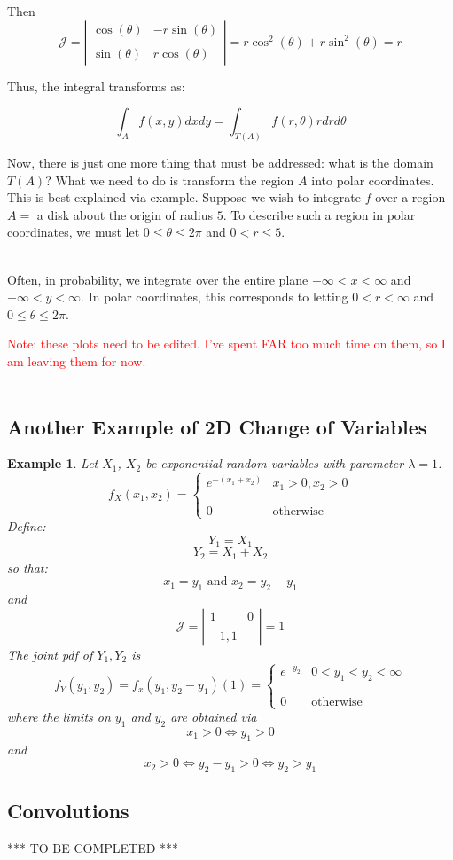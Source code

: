 \documentclass[12pt]{article} %
\newcommand{\pdf}[2]{\left\{\begin{matrix}
{#1} & {#2}\\\\\\0&\textrm{otherwise}
\end{matrix}\right.}
\newtheorem{example}{Example}
\begin{document}
Then 
$$\mathcal{J} = \left|\begin{matrix}
\cos(\theta) & -r\sin(\theta)\\\\ \sin(\theta) & r\cos(\theta)
\end{matrix}\right| = r\cos^2(\theta) + r\sin^2(\theta) = r$$

Thus, the integral transforms as:

$$\int_A f(x,y) dx dy = \int_{T(A)} f(r,\theta) r dr d\theta$$

Now, there is just one more thing that must be addressed: what is the domain $T(A)$? What we need to do is transform the region $A$ into polar coordinates. This is best explained via example. Suppose we wish to integrate $f$ over a region $A=$ a disk about the origin of radius $5$. To describe such a region in polar coordinates, we must let $0\leq\theta\leq 2\pi$ and $0<r\leq5$. \\\\


Often, in probability, we integrate over the entire plane $-\infty<x<\infty$ and $-\infty<y<\infty$.  In polar coordinates, this corresponds to letting $0<r<\infty$ and $0\leq \theta\leq 2\pi$. 

\textcolor{red}{Note: these plots need to be edited. I've spent FAR too much time on them, so I am leaving them for now.}\\\\
\subsection{Another Example of 2D Change of Variables}
\begin{example}
Let $X_1$, $X_2$ be exponential random variables with parameter $\lambda = 1$.
$$f_X(x_1,x_2) = \pdf{e^{-(x_1+x_2)}}{x_1>0, x_2>0}$$
Define:
$$Y_1 = X_1$$
$$Y_2 = X_1 + X_2$$
so that:
$$x_1 = y_1 \textrm{ and } x_2 = y_2 - y_1$$
and
$$\mathcal{J} = \left|\begin{matrix}
1&0\\\\-1,1
\end{matrix}\right| = 1$$
The joint pdf of $Y_1,Y_2$ is 
$$f_Y(y_1,y_2) = f_x(y_1,y_2 - y_1) (1) = \pdf{e^{-y_2}}{0<y_1<y_2<\infty}$$
where the limits on $y_1$ and $y_2$ are obtained via
$$x_1> 0 \iff y_1>0$$
and 
$$x_2>0\iff y_2-y_1>0\iff y_2>y_1$$
\end{example}
\subsection{Convolutions}
*** TO BE COMPLETED ***
\end{document}

